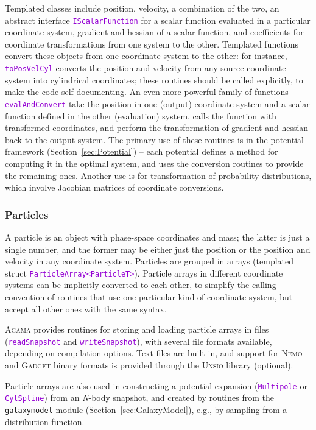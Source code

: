 \documentclass[12pt]{article}
\newcommand{\Agama}{\textsc{Agama}\xspace}
\newcommand{\Nemo} {\textsc{Nemo}\xspace}
\newcommand{\Nbody}{\textsl{N}-body\xspace}
\newcommand{\ttt}[1]{\textcolor{darkviolet}{\texttt{#1}}}
\begin{document}
Templated classes include position, velocity, a combination of the two, an abstract interface \ttt{IScalarFunction} for a scalar function evaluated in a particular coordinate system, gradient and hessian of a scalar function, and coefficients for coordinate transformations from one system to the other. Templated functions convert these objects from one coordinate system to the other: for instance, \ttt{toPosVelCyl} converts the position and velocity from any source coordinate system into cylindrical coordinates; these routines should be called explicitly, to make the code self-documenting. An even more powerful family of functions \ttt{evalAndConvert} take the position in one (output) coordinate system and a scalar function defined in the other (evaluation) system, calls the function with transformed coordinates, and perform the transformation of gradient and hessian back to the output system. The primary use of these routines is in the potential framework (Section~\ref{sec:Potential}) -- each potential defines a method for computing it in the optimal system, and uses the conversion routines to provide the remaining ones. Another use is for transformation of probability distributions, which involve Jacobian matrices of coordinate conversions.

\subsubsection{Particles}  \label{sec:Particles}
A particle is an object with phase-space coordinates and mass; the latter is just a single number, and the former may be either just the position or the position and velocity in any coordinate system. Particles are grouped in arrays (templated struct \ttt{ParticleArray<ParticleT>}).
Particle arrays in different coordinate systems can be implicitly converted to each other, to simplify the calling convention of routines that use one particular kind of coordinate system, but accept all other ones with the same syntax.

\Agama provides routines for storing and loading particle arrays in files (\ttt{readSnapshot} and \ttt{writeSnapshot}), with several file formats available, depending on compilation options. Text files are built-in, and support for \Nemo and \textsc{Gadget} binary formats is provided through the \textsc{Unsio} library (optional).

Particle arrays are also used in constructing a potential expansion (\ttt{Multipole} or \ttt{CylSpline}) from an \Nbody snapshot, and created by routines from the \texttt{galaxymodel} module (Section~\ref{sec:GalaxyModel}), e.g., by sampling from a distribution function.
\end{document}
